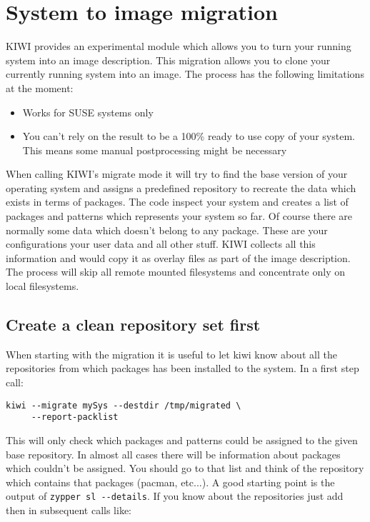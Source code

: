 \chapter{System to image migration}
\label{chapter:migration}
\minitoc

KIWI provides an experimental module which allows you to turn your
running system into an image description. This migration allows you
to clone your currently running system into an image. The process
has the following limitations at the moment:

\begin{itemize}
\item Works for SUSE systems only
\item You can't rely on the result to be a 100\% ready to use copy
      of your system. This means some manual postprocessing might
      be necessary
\end{itemize}

When calling KIWI's migrate mode it will try to find the base version
of your operating system and assigns a predefined repository to recreate
the data which exists in terms of packages. The code inspect your
system and creates a list of packages and patterns which represents
your system so far. Of course there are normally some data which
doesn't belong to any package. These are your configurations your user
data and all other stuff. KIWI collects all this information and would
copy it as overlay files as part of the image description. The process
will skip all remote mounted filesystems and concentrate only on local
filesystems.

\section{Create a clean repository set first}
When starting with the migration it is useful to let kiwi know about all
the repositories from which packages has been installed to 
the system. In a first step call:

\begin{Command}{12cm}
\begin{verbatim}
kiwi --migrate mySys --destdir /tmp/migrated \
     --report-packlist
\end{verbatim}
\end{Command}

This will only check which packages and patterns could be assigned
to the given base repository. In almost all cases there will be
information about packages which couldn't be assigned. You should
go to that list and think of the repository which contains that
packages (pacman, etc...). A good starting point is the
output of \verb+zypper sl --details+. If you know about the repositories
just add then in subsequent calls like:

